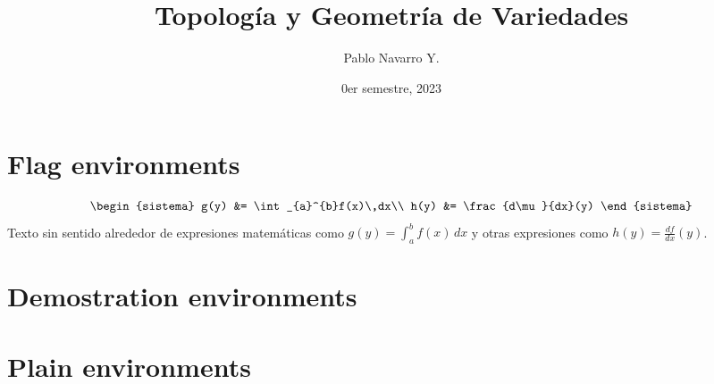 \documentclass[toc,todo,libertine]{apuntes}
\title{Topología y Geometría de Variedades}
\author{Pablo Navarro Y.}
\date{0er semestre, 2023}
\begin{document}
\renewcommand{\onlyinsubfile}[1]{}
\renewcommand{\notinsubfile}[1]{#1}
\maketitle

\section{Flag environments}

\begin{definicion}[][reff]
	\begin{equation}
		\begin{sistema}
			g(y) &= \int_{a}^{b}f(x)\,dx\\
			h(y) &= \frac{d\mu}{dx}(y)
		\end{sistema}
	\end{equation}
	Texto sin sentido alrededor de expresiones matemáticas como \(g(y) = \int_{a}^{b}f(x)\,dx\) y otras expresiones como \(h(y) = \frac{df}{dx}(y)\).
	\lipsum[1]
\end{definicion}

\begin{prop}[][reff]
	\lipsum[1]
\end{prop}

\begin{teorema}[][reff]
	\lipsum[1]
\end{teorema}

\begin{corolario}[][reff]
	\lipsum[1]
\end{corolario}

\begin{lema}[][reff]
	\lipsum[1]
\end{lema}

\section{Demostration environments}

\begin{dem}[]
	\lipsum[1]
\end{dem}

\begin{sol}[]
	\lipsum[1]
\end{sol}

\section{Plain environments}
\end{document}
